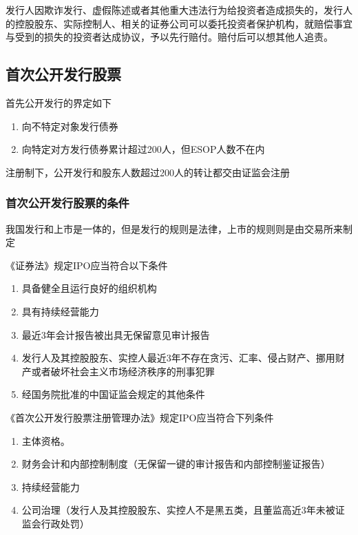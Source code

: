 \documentclass[UTF8,12pt]{ctexart}
\numberwithin{equation}{section} %
\numberwithin{figure}{section}
\numberwithin{table}{section}
\begin{document}
	发行人因欺诈发行、虚假陈述或者其他重大违法行为给投资者造成损失的，发行人的控股股东、实际控制人、相关的证券公司可以委托投资者保护机构，就赔偿事宜与受到的损失的投资者达成协议，予以先行赔付。赔付后可以想其他人追责。

	
	
	\subsection{首次公开发行股票}
	首先公开发行的界定如下
	\begin{enumerate}
		\item 向不特定对象发行债券
		
		\item 向特定对方发行债券累计超过200人，但ESOP人数不在内
	\end{enumerate}
	注册制下，公开发行和股东人数超过200人的转让都交由证监会注册
	
	\subsubsection{首次公开发行股票的条件}
	我国发行和上市是一体的，但是发行的规则是法律，上市的规则则是由交易所来制定
	
	《证券法》规定IPO应当符合以下条件
	\begin{enumerate}
		\item 具备健全且运行良好的组织机构
		
		\item 具有持续经营能力
		
		\item 最近3年会计报告被出具无保留意见审计报告
		
		\item 发行人及其控股股东、实控人最近3年不存在贪污、汇率、侵占财产、挪用财产或者破坏社会主义市场经济秩序的刑事犯罪
		
		\item 经国务院批准的中国证监会规定的其他条件
	\end{enumerate}
	
	《首次公开发行股票注册管理办法》规定IPO应当符合下列条件
	\begin{enumerate}
		\item 主体资格。
		
		\item 财务会计和内部控制制度（无保留一键的审计报告和内部控制鉴证报告）
		
		\item 持续经营能力
		
		\item 公司治理（发行人及其控股股东、实控人不是黑五类，且董监高近3年未被证监会行政处罚）
	\end{enumerate}
	
\end{document}

